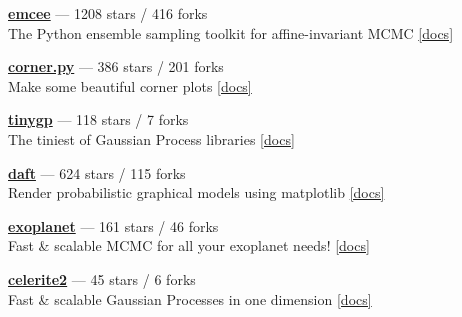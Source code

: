 \item \href{https://github.com/dfm/emcee}{{\bf emcee}} --- 1208 stars / 416 forks \\
The Python ensemble sampling toolkit for affine-invariant MCMC \href{https://emcee.readthedocs.io}{[docs]}

\item \href{https://github.com/dfm/corner.py}{{\bf corner.py}} --- 386 stars / 201 forks \\
Make some beautiful corner plots \href{http://corner.readthedocs.io}{[docs]}

\item \href{https://github.com/dfm/tinygp}{{\bf tinygp}} --- 118 stars / 7 forks \\
The tiniest of Gaussian Process libraries \href{https://tinygp.readthedocs.io}{[docs]}

\item \href{https://github.com/daft-dev/daft}{{\bf daft}} --- 624 stars / 115 forks \\
Render probabilistic graphical models using matplotlib \href{https://docs.daft-pgm.org}{[docs]}

\item \href{https://github.com/exoplanet-dev/exoplanet}{{\bf exoplanet}} --- 161 stars / 46 forks \\
Fast {\&} scalable MCMC for all your exoplanet needs!  \href{https://docs.exoplanet.codes}{[docs]}

\item \href{https://github.com/exoplanet-dev/celerite2}{{\bf celerite2}} --- 45 stars / 6 forks \\
Fast {\&} scalable Gaussian Processes in one dimension \href{https://celerite2.readthedocs.io}{[docs]}